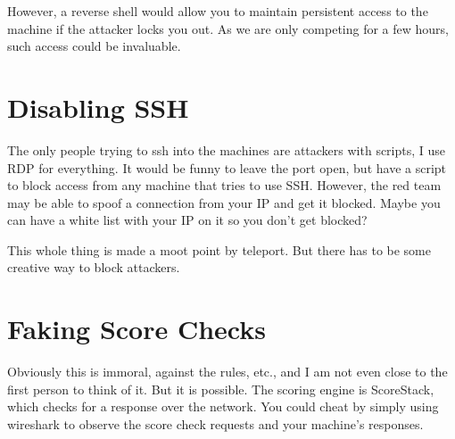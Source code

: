 \documentclass{article}
\begin{document}
However, a reverse shell would allow you to maintain persistent access to the machine if the attacker locks you out.
As we are only competing for a few hours, such access could be invaluable.

\section{Disabling SSH}
The only people trying to ssh into the machines are attackers with scripts, I use RDP for everything.
It would be funny to leave the port open, but have a script to block access from any machine that tries to use SSH.
However, the red team may be able to spoof a connection from your IP and get it blocked.
Maybe you can have a white list with your IP on it so you don't get blocked?

This whole thing is made a moot point by teleport. But there has to be some creative way to block attackers.

\section{Faking Score Checks}
Obviously this is immoral, against the rules, etc., and I am not even close to the first person to think of it.
But it is possible. The scoring engine is ScoreStack, which checks for a response over the network.
You could cheat by simply using wireshark to observe the score check requests and your machine's responses.
\end{document}
